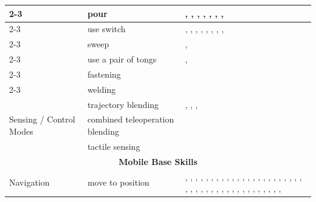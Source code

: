 \begin{table}[p]
\begin{tabular}{|p{4cm}|p{5cm}|p{15cm}|}
\cline{2-3}
    & pour                            & \cite{Stckler2014AdaptiveTS}, \cite{Pohl2024MAkEableMA}, \cite{Groth2013MultitaskingOC}, \cite{Short2019SAILSA}, \cite{Diab2020SkillMaNA}, \cite{Rosen2023SynthesizingNA}, \cite{Zhang2025ARM}, \cite{Zhang2025AgentWorldAI} \\
\cline{2-3}
    & use switch                      & \cite{Nguyen2012AutonomouslyLT}, \cite{Konidaris2012RobotLF}, \cite{Rosen2023SynthesizingNA}, \cite{Guo2025AdaptiveSC}, \cite{engelbracht2024spotlightroboticsceneunderstanding}, \cite{Gupta2025PreciseMM}, \cite{Zhang2025ARM}, \cite{Fu2024MobileAL}, \cite{Zhang2025AgentWorldAI} \\
\cline{2-3}
    & sweep                           & \cite{Stckler2014AdaptiveTS}, \cite{Yamazaki2012HomeAssistantRF} \\
\cline{2-3}
    & use a pair of tongs             & \cite{Stckler2014AdaptiveTS}, \cite{Stckler2013IncreasingFO} \\
\cline{2-3}
    & fastening                       & \cite{Li2019ManipulationSA} \\
\cline{2-3}
    & welding                         & \cite{Andersen2015IntuitiveTP} \\
\hline
\multirow{3}{*}{\parbox{4cm}{Sensing / Control Modes}}
    & trajectory blending             & \cite{Waarsing2003BehaviorbasedMM}, \cite{Waarsing2005FromBI}, \cite{Aarno2008MotionIR}, \cite{Carvalho2025ParameterFreeSO} \\
\cline{2-3}
    & combined teleoperation blending & \cite{Maeda2022BlendingPP} \\
\cline{2-3}
    & tactile sensing                 & \cite{Weser2009AutonomousPF} \\
\hline
\multicolumn{3}{|c|}{\textbf{Mobile Base Skills}} \\
\hline
\multirow{4}{*}{\parbox{2cm}{Navigation}}
    & move to position                & \cite{Weser2009AutonomousPF}, \cite{Bruemmer2010BehaviorBC}, \cite{Li2022BEHAVIOR1KAB}, \cite{Garrett2016FFRobLS}, \cite{Pedersen2015GestureBasedEO}, \cite{Frasca2020GoingCA}, \cite{Yamazaki2012HomeAssistantRF}, \cite{Stckler2013IncreasingFO}, \cite{Stckler2009IntegratingIM}, \cite{Andersen2017IntegrationOA}, \cite{Pedersen2014IntuitiveSP}, \cite{Stulp2009LearningAP}, \cite{Schmalstieg2023LearningHI}, \cite{Bouachari2018ObjectPC}, \cite{Cohen2011PlanningFM}, \cite{Toner2024PRFAP}, \cite{Partovi2017ReactiveIM}, \cite{Vasilopoulos2020ReactivePF}, \cite{Deng2017ReinforcementLO}, \cite{Li2017ReinforcementLO}, \cite{Lin2010ResearchOO}, \cite{Stuckler2012RoboCupHomeDE}, \cite{Konidaris2012RobotLF}, \cite{Pedersen2016RobotSF}, \cite{Hentout2008MultiagentAM}, \cite{Huang2023SkillTA}, \cite{Karumanchi2017TeamRS}, \cite{Thakar2018TowardsTT}, \cite{Chang2006ABB}, \cite{Wasik2002AFB}, \cite{MacKenzie1996BehaviorbasedMM}, \cite{Hentout2007BehaviourbasedAF}, \cite{Sequeira2000BehaviourbasedCB}, \cite{Andrian2005EmbeddedCI}, \cite{Nagatani2000MotionDF}, \cite{Zsoldos2025TowardsRL}, \cite{Lee2023DevelopmentAV}, \cite{Akkaladevi2024TowardsAB}, \cite{Gupta2025PreciseMM}, \cite{Fu2024MobileAL}, \cite{Mounsif2020BAMBA}, \cite{Yokoyama2023ASCAS}, \cite{Meng2023AerialMS} \\

\end{tabular}
\end{table}
